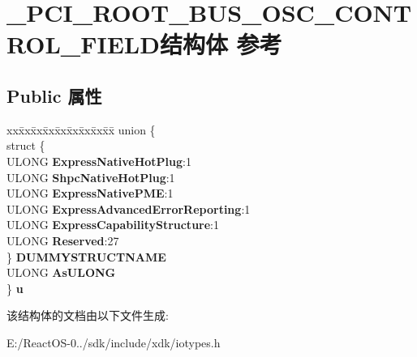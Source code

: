 \hypertarget{struct___p_c_i___r_o_o_t___b_u_s___o_s_c___c_o_n_t_r_o_l___f_i_e_l_d}{}\section{\+\_\+\+P\+C\+I\+\_\+\+R\+O\+O\+T\+\_\+\+B\+U\+S\+\_\+\+O\+S\+C\+\_\+\+C\+O\+N\+T\+R\+O\+L\+\_\+\+F\+I\+E\+L\+D结构体 参考}
\label{struct___p_c_i___r_o_o_t___b_u_s___o_s_c___c_o_n_t_r_o_l___f_i_e_l_d}
\subsection*{Public 属性}
\begin{DoxyCompactItemize}
\item 
\mbox{\label{struct___p_c_i___r_o_o_t___b_u_s___o_s_c___c_o_n_t_r_o_l___f_i_e_l_d_a303f90ad083450ef0c6e765b2e168958}} 
\begin{tabbing}
xx\=xx\=xx\=xx\=xx\=xx\=xx\=xx\=xx\=\kill
union \{\\
\>struct \{\\
\>\>ULONG {\bfseries ExpressNativeHotPlug}:1\\
\>\>ULONG {\bfseries ShpcNativeHotPlug}:1\\
\>\>ULONG {\bfseries ExpressNativePME}:1\\
\>\>ULONG {\bfseries ExpressAdvancedErrorReporting}:1\\
\>\>ULONG {\bfseries ExpressCapabilityStructure}:1\\
\>\>ULONG {\bfseries Reserved}:27\\
\>\} {\bfseries DUMMYSTRUCTNAME}\\
\>ULONG {\bfseries AsULONG}\\
\} {\bfseries u}\\

\end{tabbing}\end{DoxyCompactItemize}


该结构体的文档由以下文件生成\+:\begin{DoxyCompactItemize}
\item 
E\+:/\+React\+O\+S-\/0../sdk/include/xdk/iotypes.\+h\end{DoxyCompactItemize}
